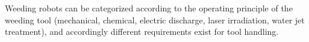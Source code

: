 \documentclass[runningheads]{llncs}
\begin{document}
% 
%

Weeding robots can be categorized according to the operating principle of the weeding tool (mechanical, chemical, electric discharge, laser irradiation, water jet treatment), and accordingly different requirements exist for tool handling.%
\end{document}
